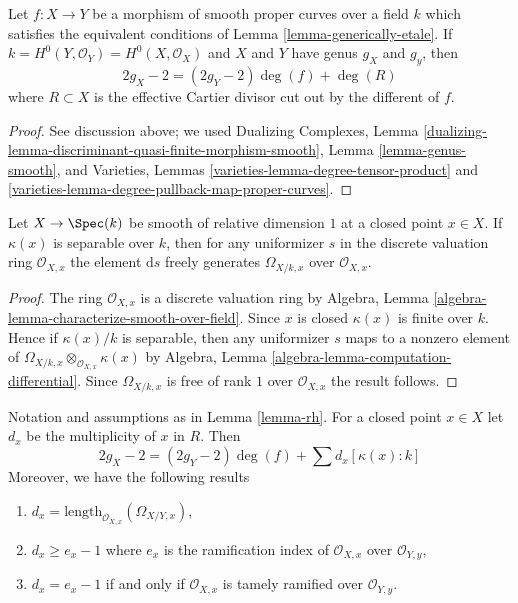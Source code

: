 \begin{lemma}
\label{lemma-rh}
Let $f : X \to Y$ be a morphism of smooth proper curves
over a field $k$ which satisfies the equivalent conditions of
Lemma \ref{lemma-generically-etale}. If
$k = H^0(Y, \mathcal{O}_Y) = H^0(X, \mathcal{O}_X)$
and $X$ and $Y$ have genus $g_X$ and $g_y$, then
$$
2g_X - 2 = (2g_Y - 2) \deg(f) + \deg(R)
$$
where $R \subset X$ is the effective Cartier divisor cut out by
the different of $f$.
\end{lemma}

\begin{proof}
See discussion above; we used
Dualizing Complexes, Lemma
\ref{dualizing-lemma-discriminant-quasi-finite-morphism-smooth},
Lemma \ref{lemma-genus-smooth}, and
Varieties, Lemmas \ref{varieties-lemma-degree-tensor-product} and
\ref{varieties-lemma-degree-pullback-map-proper-curves}.
\end{proof}

\begin{lemma}
\label{lemma-uniformizer-works}
Let $X \to \Spec(k)$ be smooth of relative dimension $1$ at a closed
point $x \in X$. If $\kappa(x)$ is separable over $k$, then for
any uniformizer $s$ in the discrete valuation ring $\mathcal{O}_{X, x}$
the element $\text{d}s$ freely generates $\Omega_{X/k, x}$
over $\mathcal{O}_{X, x}$.
\end{lemma}

\begin{proof}
The ring $\mathcal{O}_{X, x}$ is a discrete valuation ring by
Algebra, Lemma \ref{algebra-lemma-characterize-smooth-over-field}.
Since $x$ is closed $\kappa(x)$ is finite over $k$. Hence if
$\kappa(x)/k$ is separable, then any uniformizer $s$
maps to a nonzero element of
$\Omega_{X/k, x} \otimes_{\mathcal{O}_{X, x}} \kappa(x)$ by
Algebra, Lemma \ref{algebra-lemma-computation-differential}.
Since $\Omega_{X/k, x}$ is free of rank $1$ over $\mathcal{O}_{X, x}$
the result follows.
\end{proof}

\begin{lemma}
\label{lemma-rhe}
Notation and assumptions as in Lemma \ref{lemma-rh}. For a closed point
$x \in X$ let $d_x$ be the multiplicity of $x$ in $R$. Then
$$
2g_X - 2 = (2g_Y - 2) \deg(f) + \sum\nolimits d_x [\kappa(x) : k]
$$
Moreover, we have the following results
\begin{enumerate}
\item $d_x = \text{length}_{\mathcal{O}_{X, x}}(\Omega_{X/Y, x})$,
\item $d_x \geq e_x - 1$ where $e_x$ is the ramification index
of $\mathcal{O}_{X, x}$ over $\mathcal{O}_{Y, y}$,
\item $d_x = e_x - 1$ if and only if $\mathcal{O}_{X, x}$ is tamely
ramified over $\mathcal{O}_{Y, y}$.
\end{enumerate}
\end{lemma}


